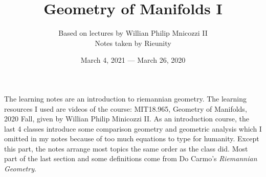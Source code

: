 \documentclass[a4paper,12pt]{article}
\begin{document}
\title{Geometry of Manifolds I}
\author{Based on lectures by Willian Philip  Mnicozzi II\\
\small Notes taken by Rieunity}
\date{March 4, 2021 --- March 26, 2020}  
\maketitle
\thispagestyle{empty}
  The learning notes are an introduction to riemannian geometry. The learning resources I used are videos of the course: MIT18.965, Geometry of Manifolds, 2020 Fall, given by Willian Philip Minicozzi II. As an introduction course, the last 4 classes introduce some comparison geometry and geometric analysis which I omitted in my notes because of too much equations to type for humanity. Except this part, the notes arrange most topics the same order as the class did. Most part of the last section and some definitions come from Do Carmo's \textit{Riemannian Geometry}.
\tableofcontents


%
%
\end{document}
